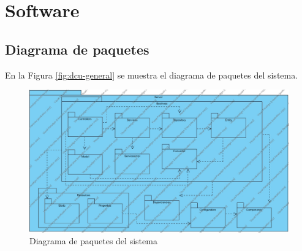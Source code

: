 





\section{Software}
\subsection{Diagrama de paquetes}
En la Figura \ref{fig:dcu-general} se muestra el diagrama de paquetes del sistema.
\begin{figure}[H]
	\centering
	\includegraphics[scale=.198]{Capitulo4/images/Paquetes}
	\caption{Diagrama de paquetes del sistema}
	\label{fig:diagrama_paquetes}
\end{figure}
